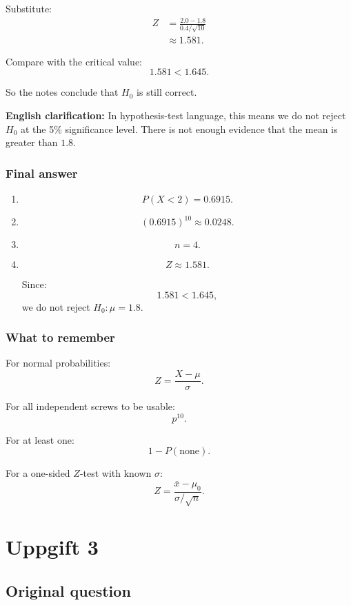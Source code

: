 \documentclass[10pt]{article}
\begin{document}
Substitute:
\begin{align*}
Z
&=
\frac{2.0-1.8}{0.4/\sqrt{10}}
\\[2mm]
&\approx
1.581.
\end{align*}

Compare with the critical value:
\[
1.581<1.645.
\]

So the notes conclude that \(H_0\) is still correct.

\textbf{English clarification:}
In hypothesis-test language, this means we do not
reject \(H_0\) at the 5\% significance level.
There is not enough evidence that the mean is greater
than \(1.8\).

\subsubsection*{Final answer}

\begin{enumerate}[label=\alph*)]
\item
\[
P(X<2)=0.6915.
\]

\item
\[
(0.6915)^{10}\approx 0.0248.
\]

\item
\[
n=4.
\]

\item
\[
Z\approx 1.581.
\]

Since:
\[
1.581<1.645,
\]
we do not reject \(H_0:\mu=1.8\).
\end{enumerate}

\subsubsection*{What to remember}

For normal probabilities:
\[
Z=\frac{X-\mu}{\sigma}.
\]

For all independent screws to be usable:
\[
p^{10}.
\]

For at least one:
\[
1-P(\text{none}).
\]

For a one-sided \(Z\)-test with known \(\sigma\):
\[
Z=
\frac{\bar{x}-\mu_0}{\sigma/\sqrt{n}}.
\]

\section*{Uppgift 3}

\subsection*{Original question}
\end{document}
